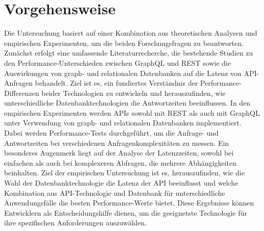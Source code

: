 \section{Vorgehensweise} %
\label{sec:vorgehensweise}
Die Untersuchung basiert auf einer Kombination aus theoretischen Analysen und empirischen Experimenten, um die beiden Forschungsfragen zu beantworten. Zunächst erfolgt eine umfassende Literaturrecherche, die bestehende Studien zu den Performance-Unterschieden zwischen GraphQL und REST sowie die Auswirkungen von graph- und relationalen Datenbanken auf die Latenz von API-Anfragen behandelt. Ziel ist es, ein fundiertes Verständnis der Performance-Differenzen beider Technologien zu entwickeln und herauszufinden, wie unterschiedliche Datenbanktechnologien die Antwortzeiten beeinflussen.
In den empirischen Experimenten werden APIs sowohl mit REST als auch mit GraphQL unter Verwendung von graph- und relationalen Datenbanken implementiert. Dabei werden Performance-Tests durchgeführt, um die Anfrage- und Antwortzeiten bei verschiedenen Anfragenkomplexitäten zu messen. Ein besonderes Augenmerk liegt auf der Analyse der Latenzzeiten, sowohl bei einfachen als auch bei komplexeren Abfragen, die mehrere Abhängigkeiten beinhalten. Ziel der empirischen Untersuchung ist es, herauszufinden, wie die Wahl der Datenbanktechnologie die Latenz der API beeinflusst und welche Kombination aus API-Technologie und Datenbank für unterschiedliche Anwendungsfälle die besten Performance-Werte bietet. Diese Ergebnisse können Entwicklern als Entscheidungshilfe dienen, um die geeignetste Technologie für ihre spezifischen Anforderungen auszuwählen.
